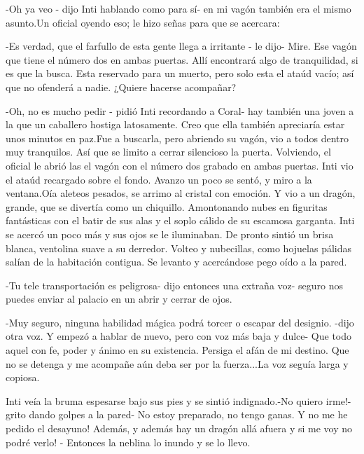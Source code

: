 -Oh ya veo - dijo Inti hablando como para sí- en mi vagón también era el mismo asunto.Un oficial oyendo eso; le hizo señas para que se acercara:

-Es verdad, que el farfullo de esta gente llega a irritante - le dijo- Mire. Ese vagón que tiene el número dos en ambas puertas. Allí encontrará algo de tranquilidad, si es que la busca. Esta reservado para un muerto, pero solo esta el ataúd vacío; así que no ofenderá a nadie. ¿Quiere hacerse acompañar?

-Oh, no es mucho pedir - pidió Inti recordando a Coral- hay también una joven a la que un caballero hostiga latosamente. Creo que ella también apreciaría estar unos minutos en paz.Fue a buscarla, pero abriendo su vagón, vio a todos dentro muy tranquilos. Así que se limito a cerrar silencioso la puerta. Volviendo, el oficial le abrió las el vagón con el número dos grabado en ambas puertas. Inti vio el ataúd recargado sobre el fondo. Avanzo un poco se sentó, y miro a la ventana.Oía aleteos pesados, se arrimo al cristal con emoción. Y vio a un dragón, grande, que se divertía como un chiquillo. Amontonando nubes en figuritas fantásticas con el batir de sus alas y el soplo cálido de su escamosa garganta. Inti se acercó un poco más y sus ojos se le iluminaban. De pronto sintió un brisa blanca, ventolina suave a su derredor. Volteo y nubecillas, como hojuelas pálidas salían de la habitación contigua. Se levanto y acercándose pego oído a la pared.

-Tu tele transportación es peligrosa- dijo entonces una extraña voz- seguro nos puedes enviar al palacio en un abrir y cerrar de ojos.

-Muy seguro, ninguna habilidad mágica podrá torcer o escapar del designio. -dijo otra voz. Y empezó a hablar de nuevo, pero con voz más baja y dulce- Que todo aquel con fe, poder y ánimo en su existencia. Persiga el afán de mi destino. Que no se detenga y me acompañe aún deba ser por la fuerza...La voz seguía larga y copiosa.

Inti veía la bruma espesarse bajo sus pies y se sintió indignado.-No quiero irme!- grito dando golpes a la pared- No estoy preparado, no tengo ganas. Y no me he pedido el desayuno! Además, y además hay un dragón allá afuera y si me voy no podré verlo! - Entonces la neblina lo inundo y se lo llevo.



